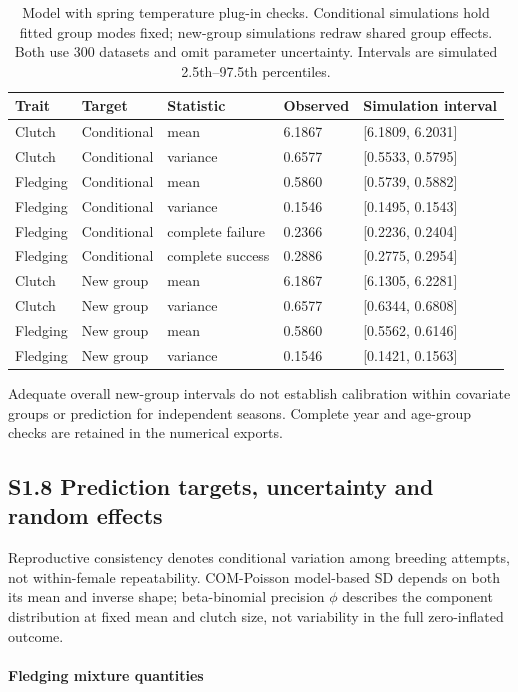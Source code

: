 \documentclass{article}
\begin{document}
\begin{table}[!ht]\centering\scriptsize\singlespacing
\caption{Model with spring temperature plug-in checks. Conditional simulations hold fitted group modes fixed; new-group simulations redraw shared group effects. Both use 300 datasets and omit parameter uncertainty. Intervals are simulated 2.5th--97.5th percentiles.}\label{tab:revised-checks}
\begin{tabular}{lllll}\toprule
Trait & Target & Statistic & Observed & Simulation interval\\\midrule
Clutch & Conditional & mean & 6.1867 & [6.1809, 6.2031]\\
Clutch & Conditional & variance & 0.6577 & [0.5533, 0.5795]\\
Fledging & Conditional & mean & 0.5860 & [0.5739, 0.5882]\\
Fledging & Conditional & variance & 0.1546 & [0.1495, 0.1543]\\
Fledging & Conditional & complete failure & 0.2366 & [0.2236, 0.2404]\\
Fledging & Conditional & complete success & 0.2886 & [0.2775, 0.2954]\\
Clutch & New group & mean & 6.1867 & [6.1305, 6.2281]\\
Clutch & New group & variance & 0.6577 & [0.6344, 0.6808]\\
Fledging & New group & mean & 0.5860 & [0.5562, 0.6146]\\
Fledging & New group & variance & 0.1546 & [0.1421, 0.1563]\\
\bottomrule\end{tabular}\end{table}
Adequate overall new-group intervals do not establish calibration within covariate groups or prediction for independent seasons. Complete year and age-group checks are retained in the numerical exports.

\subsection{S1.8 Prediction targets, uncertainty and random effects}

Reproductive consistency denotes conditional variation among breeding attempts, not within-female repeatability. COM-Poisson model-based SD depends on both its mean and inverse shape; beta-binomial precision $\phi$ describes the component distribution at fixed mean and clutch size, not variability in the full zero-inflated outcome.

\paragraph{Fledging mixture quantities}
\end{document}
